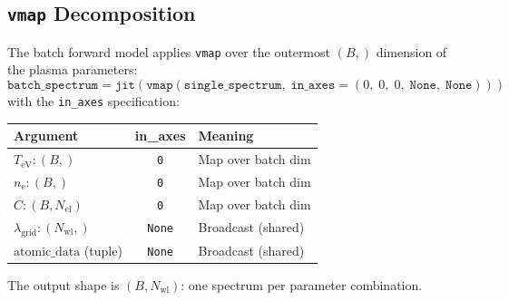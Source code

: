 \documentclass[11pt]{article}
\newcommand{\TeV}{T_\mathrm{eV}}
\newcommand{\ne}{n_\mathrm{e}}
\begin{document}
\subsection{\texttt{vmap} Decomposition}
\label{sec:vmap-spec}

The batch forward model applies \texttt{vmap} over the outermost
$(B,)$ dimension of the plasma parameters:
\begin{equation}
  \label{eq:vmap-def}
  \boxed{
  \texttt{batch\_spectrum} =
  \texttt{jit}\!\left(\texttt{vmap}\!\left(
    \texttt{single\_spectrum},\;
    \texttt{in\_axes} = (0,\; 0,\; 0,\; \texttt{None},\; \texttt{None})
  \right)\right)
  }
\end{equation}
with the \texttt{in\_axes} specification:
\begin{center}
\begin{tabular}{lcl}
\toprule
\textbf{Argument} & \textbf{in\_axes} & \textbf{Meaning} \\
\midrule
$\TeV\colon (B,)$                        & \texttt{0} & Map over batch dim \\
$\ne\colon (B,)$                          & \texttt{0} & Map over batch dim \\
$C\colon (B, N_\mathrm{el})$             & \texttt{0} & Map over batch dim \\
$\lambda_\mathrm{grid}\colon (N_\mathrm{wl},)$ & \texttt{None} & Broadcast (shared) \\
$\mathrm{atomic\_data}$ (tuple)           & \texttt{None} & Broadcast (shared) \\
\bottomrule
\end{tabular}
\end{center}

The output shape is $(B, N_\mathrm{wl})$: one spectrum per parameter combination.
\end{document}
